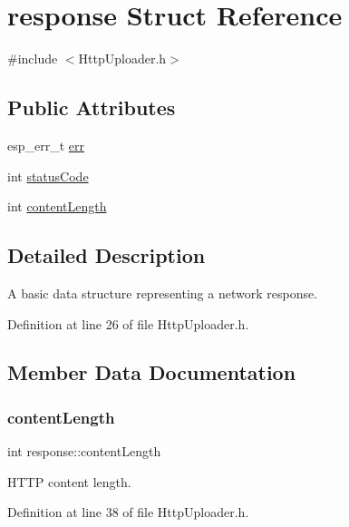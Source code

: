 \hypertarget{structresponse}{}\section{response Struct Reference}
\label{structresponse}


{\ttfamily \#include $<$Http\+Uploader.\+h$>$}

\subsection*{Public Attributes}
\begin{DoxyCompactItemize}
\item 
esp\+\_\+err\+\_\+t \mbox{\hyperlink{structresponse_aaa39845f9866322d6627a038992a32e8}{err}}
\item 
int \mbox{\hyperlink{structresponse_afe8bcb416d3c9071b2341046fa9ccfc4}{status\+Code}}
\item 
int \mbox{\hyperlink{structresponse_a0dec17408457022995abff935a1607ef}{content\+Length}}
\end{DoxyCompactItemize}


\subsection{Detailed Description}
A basic data structure representing a network response. 

Definition at line 26 of file Http\+Uploader.\+h.



\subsection{Member Data Documentation}
\mbox{\label{structresponse_a0dec17408457022995abff935a1607ef}} 
\subsubsection{\texorpdfstring{contentLength}{contentLength}}
{\footnotesize\ttfamily int response\+::content\+Length}

H\+T\+TP content length. 

Definition at line 38 of file Http\+Uploader.\+h.

\mbox{\label{structresponse_aaa39845f9866322d6627a038992a32e8}} 
